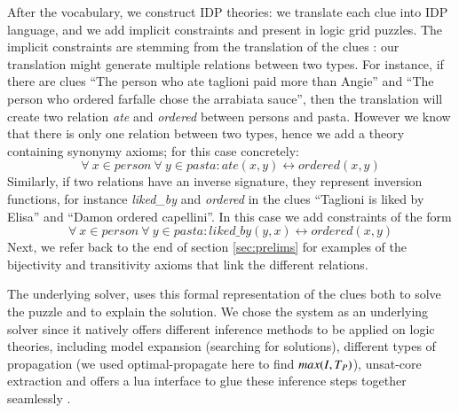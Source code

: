 After the vocabulary, we construct IDP theories: we translate each clue into IDP language, and  we add implicit constraints and present in logic grid puzzles.
The implicit constraints are stemming from the translation of the clues : our translation might generate multiple relations between two types. 
For instance, if there are clues ``The person who ate taglioni paid more than Angie'' and ``The person who ordered farfalle chose the arrabiata sauce'', then the translation will create two relation \textit{ate} and \textit{ordered} between persons and pasta.
However we know that there is only one relation between two types, hence we add a theory containing synonymy axioms; for this case concretely:
\[ \forall \ x \in person \ \forall \ y \in pasta : ate(x, y) \leftrightarrow ordered(x, y) \]
Similarly, if two relations have an inverse signature, they represent inversion functions, for instance \textit{liked\_by} and \textit{ordered} in the clues ``Taglioni is liked by Elisa'' and ``Damon ordered capellini''. 
In this case we add constraints of the form 
\[ \forall \ x \in person \ \forall \ y \in pasta : liked\_by(y, x) \leftrightarrow ordered(x, y)\]
Next, we refer back to the end of section \ref{sec:prelims} for examples of the bijectivity and transitivity axioms that link the different relations.

The underlying solver, \idp\cite{IDP} uses this formal representation of the clues both to solve the puzzle and to explain the solution. 
We chose the \idp system as an underlying solver since it natively offers different inference methods to be applied on logic theories, including model expansion (searching for solutions), different types of propagation (we used optimal-propagate here to find $max(I,T_P)$), unsat-core extraction and offers a lua interface to glue these inference steps together seamlessly \cite{IDP}.


